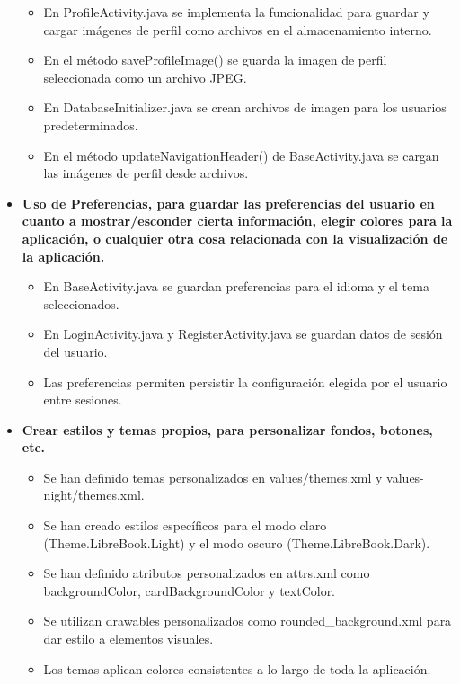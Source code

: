 \documentclass[a4paper,10pt]{report}
\begin{document}
\begin{itemize}
\begin{itemize}
          \item En ProfileActivity.java se implementa la funcionalidad para guardar y cargar imágenes de perfil como archivos en el almacenamiento interno.
          \item En el método saveProfileImage() se guarda la imagen de perfil seleccionada como un archivo JPEG.
          \item En DatabaseInitializer.java se crean archivos de imagen para los usuarios predeterminados.
          \item En el método updateNavigationHeader() de BaseActivity.java se cargan las imágenes de perfil desde archivos.
        \end{itemize}
        \item \textbf{Uso de Preferencias, para guardar las preferencias del usuario en cuanto a mostrar/esconder cierta información, elegir colores para la aplicación, o cualquier otra cosa relacionada con la visualización de la aplicación.}
        \begin{itemize}
          \item En BaseActivity.java se guardan preferencias para el idioma y el tema seleccionados.
          \item En LoginActivity.java y RegisterActivity.java se guardan datos de sesión del usuario.
          \item Las preferencias permiten persistir la configuración elegida por el usuario entre sesiones.
        \end{itemize}
        \item \textbf{Crear estilos y temas propios, para personalizar fondos, botones, etc.}
        \begin{itemize}
          \item Se han definido temas personalizados en values/themes.xml y values-night/themes.xml\cite{androidUIUX}.
          \item Se han creado estilos específicos para el modo claro (Theme.LibreBook.Light) y el modo oscuro (Theme.LibreBook.Dark).
          \item Se han definido atributos personalizados en attrs.xml como backgroundColor, cardBackgroundColor y textColor.
          \item Se utilizan drawables personalizados como rounded\_background.xml para dar estilo a elementos visuales.
          \item Los temas aplican colores consistentes a lo largo de toda la aplicación.
        \end{itemize}

\end{itemize}
\end{document}
